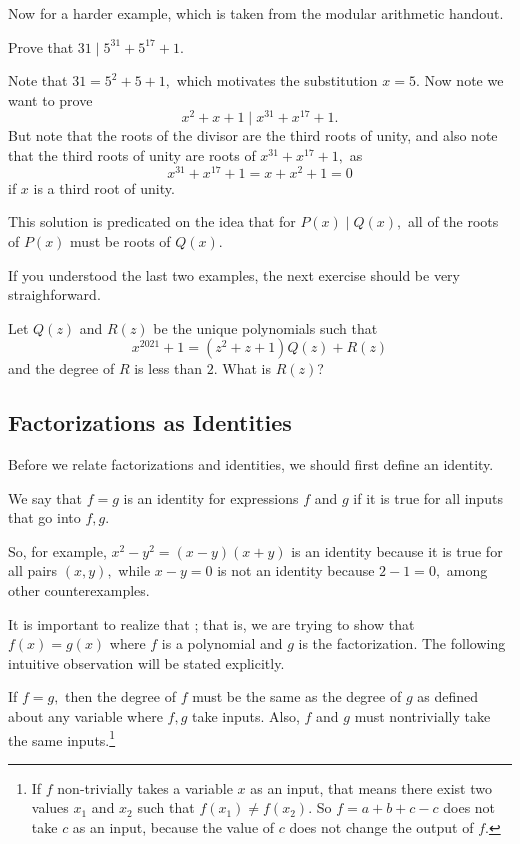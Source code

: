 \documentclass[mast]{lucky}
\begin{document}
Now for a harder example, which is taken from the modular arithmetic handout.

\begin{exam}
Prove that $31\mid 5^{31}+5^{17}+1.$
\end{exam}

\begin{sol}
Note that $31=5^2+5+1,$ which motivates the substitution $x=5.$ Now note we want to prove
\[x^2+x+1\mid x^{31}+x^{17}+1.\]
But note that the roots of the divisor are the third roots of unity, and also note that the third roots of unity are roots of $x^{31}+x^{17}+1,$ as
\[x^{31}+x^{17}+1=x+x^2+1=0\]
if $x$ is a third root of unity.
\end{sol}
This solution is predicated on the idea that for $P(x)\mid Q(x),$ all of the roots of $P(x)$ must be roots of $Q(x).$

If you understood the last two examples, the next exercise should be very straighforward.

\begin{exam}[AMC 12B 2021/20]
Let $Q(z)$ and $R(z)$ be the unique polynomials such that
\[x^{2021}+1=(z^2+z+1)Q(z)+R(z)\]
and the degree of $R$ is less than $2$. What is $R(z)$?
\end{exam}

\subsection{Factorizations as Identities}

Before we relate factorizations and identities, we should first define an identity.

\begin{defi}[Identity]
We say that $f=g$ is an identity for expressions $f$ and $g$ if it is true for all inputs that go into $f,g$.
\end{defi}

So, for example, $x^2-y^2=(x-y)(x+y)$ is an identity because it is true for all pairs $(x,y),$ while $x-y=0$ is not an identity because $2-1=0,$ among other counterexamples.

It is important to realize that ; that is, we are trying to show that $f(x)=g(x)$ where $f$ is a polynomial and $g$ is the factorization. The following intuitive observation will be stated explicitly.

\begin{theo}
If $f=g,$ then the degree of $f$ must be the same as the degree of $g$ as defined about any variable where $f,g$ take inputs. Also, $f$ and $g$ must nontrivially take the same inputs.\footnote{If $f$ non-trivially takes a variable $x$ as an input, that means there exist two values $x_1$ and $x_2$ such that $f(x_1)\neq f(x_2).$ So $f=a+b+c-c$ does not take $c$ as an input, because the value of $c$ does not change the output of $f.$}
\end{theo}
\end{document}
